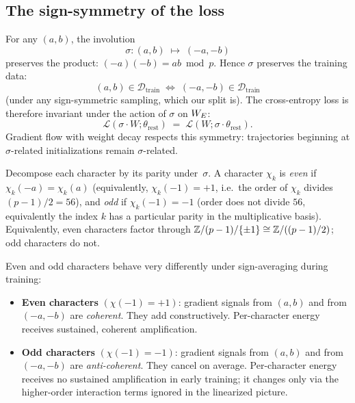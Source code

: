\subsection{The sign-symmetry of the loss}
\label{subsec:bgeo-sign-symmetry}

For any $(a, b)$, the involution
\begin{equation}
  \sigma : (a, b) \;\longmapsto\; (-a, -b)
  \label{eq:bgeo-sigma}
\end{equation}
preserves the product: $(-a)(-b) = ab \bmod p$.  Hence $\sigma$ preserves the
training data:
\begin{equation}
  (a, b) \in \mathcal D_{\text{train}} \;\iff\; (-a, -b) \in \mathcal D_{\text{train}}
\end{equation}
(under any sign-symmetric sampling, which our split is). The cross-entropy
loss is therefore invariant under the action of $\sigma$ on $W_E$:
\begin{equation}
  \mathcal L(\sigma \cdot W; \theta_{\text{rest}}) \;=\; \mathcal L(W; \sigma \cdot \theta_{\text{rest}}).
\end{equation}
Gradient flow with weight decay respects this symmetry: trajectories
beginning at $\sigma$-related initializations remain $\sigma$-related.

Decompose each character by its parity under~$\sigma$.  A character
$\chi_k$ is \emph{even} if $\chi_k(-a) = \chi_k(a)$ (equivalently,
$\chi_k(-1) = +1$, i.e.\ the order of $\chi_k$ divides $(p-1)/2 = 56$), and
\emph{odd} if $\chi_k(-1) = -1$ (order does not divide $56$, equivalently
the index $k$ has a particular parity in the multiplicative basis).
Equivalently, even characters factor through $\mathbb{Z}/(p-1)/\{\pm 1\} \cong
\mathbb{Z}/((p-1)/2)$; odd characters do not.

Even and odd characters behave very differently under sign-averaging during
training:

\begin{itemize}[leftmargin=*]
  \item \textbf{Even characters} $(\chi(-1) = +1)$: gradient signals from
        $(a,b)$ and from $(-a,-b)$ are \emph{coherent}.  They add
        constructively.  Per-character energy receives sustained, coherent
        amplification.
  \item \textbf{Odd characters} $(\chi(-1) = -1)$: gradient signals from
        $(a,b)$ and from $(-a,-b)$ are \emph{anti-coherent}.  They cancel
        on average.  Per-character energy receives no sustained
        amplification in early training; it changes only via the
        higher-order interaction terms ignored in the linearized picture.
\end{itemize}

